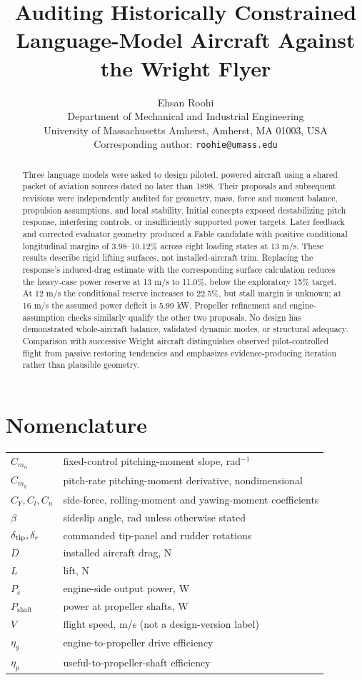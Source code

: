 \documentclass[11pt,a4paper]{article}
\title{Auditing Historically Constrained Language-Model Aircraft Against the Wright Flyer}
\author{Ehsan Roohi\\
\small Department of Mechanical and Industrial Engineering\\
\small University of Massachusetts Amherst, Amherst, MA 01003, USA\\
\small Corresponding author: \texttt{roohie@umass.edu}}
\date{}
\begin{document}
\maketitle

\begin{abstract}
Three language models were asked to design piloted, powered aircraft using a shared packet of aviation sources dated no later than 1898. Their proposals and subsequent revisions were independently audited for geometry, mass, force and moment balance, propulsion assumptions, and local stability. Initial concepts exposed destabilizing pitch response, interfering controls, or insufficiently supported power targets. Later feedback and corrected evaluator geometry produced a Fable candidate with positive conditional longitudinal margins of 3.98--10.12\% across eight loading states at 13 m/s. These results describe rigid lifting surfaces, not installed-aircraft trim. Replacing the response's induced-drag estimate with the corresponding surface calculation reduces the heavy-case power reserve at 13 m/s to 11.0\%, below the exploratory 15\% target. At 12 m/s the conditional reserve increases to 22.5\%, but stall margin is unknown; at 16 m/s the assumed power deficit is 5.99 kW. Propeller refinement and engine-assumption checks similarly qualify the other two proposals. No design has demonstrated whole-aircraft balance, validated dynamic modes, or structural adequacy. Comparison with successive Wright aircraft distinguishes observed pilot-controlled flight from passive restoring tendencies and emphasizes evidence-producing iteration rather than plausible geometry.
\end{abstract}

\section*{Nomenclature}
\noindent\begin{tabular}{@{}ll@{}}
$C_{m_\alpha}$ & fixed-control pitching-moment slope, rad$^{-1}$\\
$C_{m_q}$ & pitch-rate pitching-moment derivative, nondimensional\\
$C_Y,C_l,C_n$ & side-force, rolling-moment and yawing-moment coefficients\\
$\beta$ & sideslip angle, rad unless otherwise stated\\
$\delta_{\rm tip},\delta_r$ & commanded tip-panel and rudder rotations\\
$D$ & installed aircraft drag, N\\
$L$ & lift, N\\
$P_e$ & engine-side output power, W\\
$P_{\mathrm{shaft}}$ & power at propeller shafts, W\\
$V$ & flight speed, m/s (not a design-version label)\\
$\eta_g$ & engine-to-propeller drive efficiency\\
$\eta_p$ & useful-to-propeller-shaft efficiency\\
\end{tabular}
\end{document}
